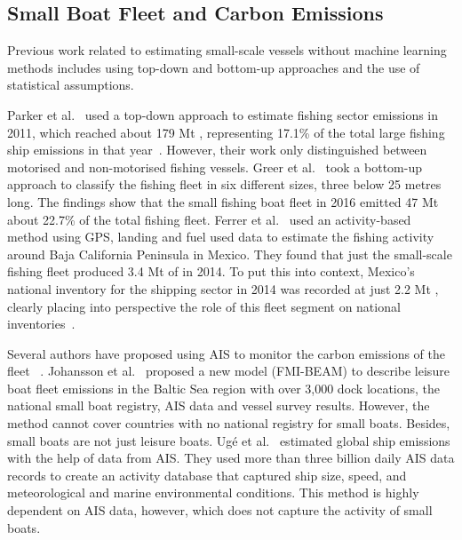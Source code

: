 
\subsection{Small Boat Fleet and Carbon Emissions}
Previous work related to estimating small-scale vessels without machine learning methods includes using top-down and bottom-up approaches and the use of statistical assumptions. 

Parker et al.~\cite{parker2018fuel} used a top-down approach to estimate fishing sector emissions in 2011, which reached about 179 Mt , representing 17.1\% of the total large fishing ship emissions in that year~\cite{smith2015third}. However, their work only distinguished between motorised and non-motorised fishing vessels. Greer et al.~\cite{GREER2019103382} took a bottom-up approach to classify the fishing fleet in six different sizes, three below 25 metres long. The findings show that the small fishing boat fleet in 2016 emitted 47 Mt  about 22.7\% of the total fishing fleet. Ferrer et al.~\cite{ferrer2021mexican} used an activity-based method using GPS, landing and fuel used data to estimate the fishing activity around Baja California Peninsula in Mexico. They found that just the small-scale fishing fleet produced 3.4 Mt of  in 2014. To put this into context, Mexico’s national inventory for the shipping sector in 2014 was recorded at just 2.2 Mt , clearly placing into perspective the role of this fleet segment on national inventories~\cite{inecc2020inventario}.

Several authors have proposed using AIS to monitor the carbon emissions of the fleet ~\cite{Traut2013MonitoringSE, Johansson2016ACM, Mabunda2014EstimatingCD, Hensel2020GreenSU, Han2016RealtimeIA}. Johansson et al.~\cite{Johansson2018ModelingOL} proposed a new model (FMI-BEAM) to describe leisure boat fleet emissions in the Baltic Sea region with over 3,000 dock locations, the national small boat registry, AIS data and vessel survey results. However, the method cannot cover countries with no national registry for small boats. Besides, small boats are not just leisure boats. Ug{\'e} et al.~\cite{Ug2020EstimationOW} estimated global ship emissions with the help of data from AIS. They used more than three billion daily AIS data records to create an activity database that captured ship size, speed, and meteorological and marine environmental conditions. This method is highly dependent on AIS data, however, which does not capture the activity of small boats.


